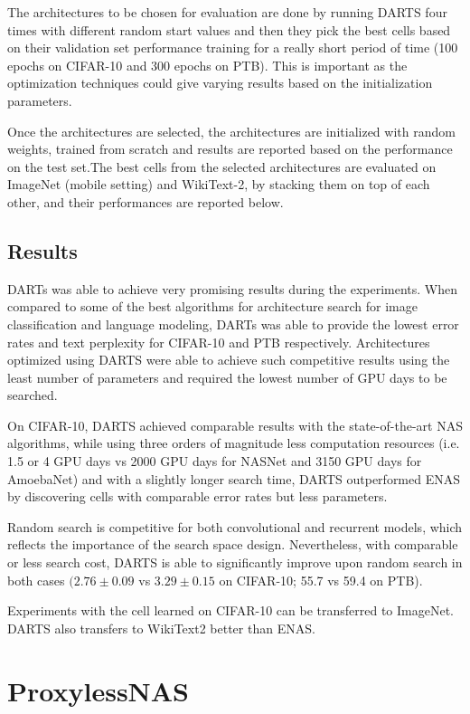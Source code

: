\documentclass{ieee}
\begin{document}
The architectures to be chosen for evaluation are done by running DARTS four times with different random start values and then they pick the best cells based on their validation set performance training for a really short period of time (100 epochs on CIFAR-10 and 300 epochs on PTB). This is important as the optimization techniques could give varying results based on the initialization parameters.

Once the architectures are selected, the architectures are initialized with random weights, trained from scratch and results are reported based on the performance on the test set.The best cells from the selected architectures are evaluated on ImageNet (mobile setting) and WikiText-2, by stacking them on top of each other, and their performances are reported below.


\subsection{Results}
DARTs was able to achieve very promising results during the experiments. When compared to some of the best algorithms for architecture search for image classification and language modeling, DARTs was able to provide the lowest error rates and text perplexity for CIFAR-10 and PTB respectively. Architectures optimized using DARTS were able to achieve such competitive results using the least number of parameters and required the lowest number of GPU days to be searched.

On CIFAR-10, DARTS achieved comparable results with the state-of-the-art NAS algorithms, while using three orders of magnitude less computation resources (i.e. 1.5 or 4 GPU days vs 2000 GPU days for NASNet and 3150 GPU days for AmoebaNet) and with a slightly longer search time, DARTS outperformed ENAS by discovering cells with comparable error rates but less parameters.

Random search is competitive for both convolutional and recurrent models, which reflects the importance of the search space design. Nevertheless, with comparable or less search cost, DARTS is able to significantly improve upon random search in both cases $(2.76 \pm 0.09$ vs $3.29 \pm 0.15$ on CIFAR-10; 55.7 vs 59.4 on PTB).

Experiments with the cell learned on CIFAR-10 can be transferred to ImageNet. DARTS also transfers to WikiText2 better than ENAS.

\section{ProxylessNAS}
\end{document}
